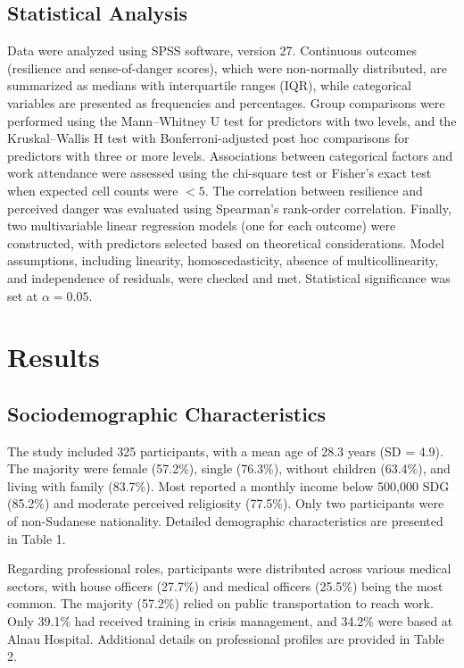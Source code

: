 \documentclass[12pt]{article}
\begin{document}
\subsection{Statistical Analysis}
Data were analyzed using SPSS software, version 27. Continuous outcomes (resilience and sense-of-danger scores), which were non-normally distributed, are summarized as medians with interquartile ranges (IQR), while categorical variables are presented as frequencies and percentages. Group comparisons were performed using the Mann–Whitney U test for predictors with two levels, and the Kruskal–Wallis H test with Bonferroni-adjusted post hoc comparisons for predictors with three or more levels. Associations between categorical factors and work attendance were assessed using the chi-square test or Fisher’s exact test when expected cell counts were $<5$. The correlation between resilience and perceived danger was evaluated using Spearman’s rank-order correlation. Finally, two multivariable linear regression models (one for each outcome) were constructed, with predictors selected based on theoretical considerations. Model assumptions, including linearity, homoscedasticity, absence of multicollinearity, and independence of residuals, were checked and met. Statistical significance was set at $\alpha = 0.05$.




\section{Results}
\subsection{Sociodemographic Characteristics}
The study included 325 participants, with a mean age of 28.3 years (SD = 4.9). The majority were female (57.2\%), single (76.3\%), without children (63.4\%), and living with family (83.7\%). Most reported a monthly income below 500,000 SDG (85.2\%) and moderate perceived religiosity (77.5\%). Only two participants were of non-Sudanese nationality. Detailed demographic characteristics are presented in Table 1.

Regarding professional roles, participants were distributed across various medical sectors, with house officers (27.7\%) and medical officers (25.5\%) being the most common. The majority (57.2\%) relied on public transportation to reach work. Only 39.1\% had received training in crisis management, and 34.2\% were based at Alnau Hospital. Additional details on professional profiles are provided in Table 2.
\end{document}
